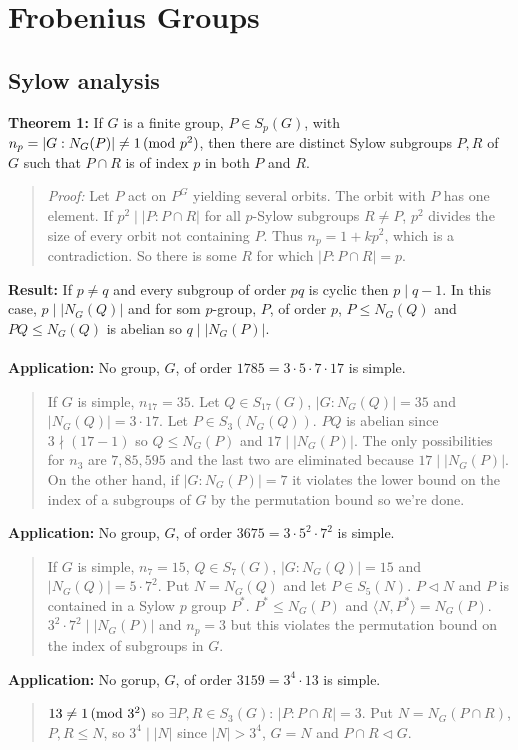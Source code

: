 \chapter{Frobenius Groups}
\section {Sylow analysis}
{\bf Theorem 1:} 
If $G$ is a finite group, $P \in S_p(G)$,  with $n_p = |G:N_G(P)| \ne 1 \thinspace \textnormal{(mod } p^2 \textnormal{)}$,
then there are distinct Sylow subgroups $P, R$ of $G$ such that $P \cap R$ is of index $p$
in both $P$ and $R$.
\begin{quote}
\emph{Proof:}
Let $P$ act on $P^G$ yielding several orbits.  The orbit with $P$ has one element.
If $p^2 \mid |P:P \cap R|$ for all $p$-Sylow subgroups $R \ne P$, $p^2$ divides the size of
every orbit not containing $P$.  Thus $n_p = 1 + kp^2$, which is a contradiction.  So there is
some $R$ for which $|P: P \cap R| = p$.
\end{quote}
{\bf Result:} If $p \ne q$ and every subgroup of order $pq$ is cyclic then $p \mid q-1$.  In this
case, $p \mid |N_G(Q)|$ and for som $p$-group, $P$, of order $p$, $P \leq N_G(Q)$ and $PQ \leq N_G(Q)$ is
abelian so $q \mid |N_G(P)|$.
\\
\\
{\bf Application:} No group, $G$, of order $1785 = 3 \cdot 5 \cdot 7 \cdot 17$ is simple.
\begin{quote}
If $G$ is simple,
$n_{17} =35$.  Let $Q \in S_{17}(G)$, $|G:N_G(Q)|=35$ and $|N_G(Q)|= 3 \cdot 17$.  Let $P \in S_3(N_G(Q))$.
$PQ$ is abelian since $3 \nmid (17 - 1)$ so $Q \leq N_G(P)$ and $17 \mid |N_G(P)|$.  The only possibilities for $n_3$ are
$7, 85, 595$ and the last two are eliminated because $17 \mid |N_G(P)|$.  On the other hand, if $|G:N_G(P)| =7$ it
violates the lower bound on the index of a subgroups of $G$ by the permutation bound so we're done.
\end{quote}
{\bf Application:} No group, $G$, of order $3675 = 3 \cdot 5^2 \cdot 7^2$ is simple.
\begin{quote}
If $G$ is simple, $n_7 = 15$, $Q \in S_7(G)$, $|G:N_G(Q)|= 15$ and $|N_G(Q)|= 5 \cdot 7^2$.  Put $N = N_G(Q)$ and
let $P \in S_5(N)$.  $P \lhd N$ and $P$ is contained in a Sylow $p$ group $P^*$. $P^* \leq N_G(P)$ and 
$\langle N, P^* \rangle= N_G(P)$.  $3^2 \cdot 7^2 \mid |N_G(P)|$ and $n_p = 3$ but this violates
the permutation bound on the index of subgroups in $G$.
\end{quote}
{\bf Application:} No gorup, $G$, of order $3159= 3^4 \cdot 13$ is simple.
\begin{quote}
$13 \ne 1 \thinspace \textnormal{(mod } 3^2 \textnormal{)}$ so $\exists P, R \in S_3(G)$: $|P:P \cap R| = 3$.  Put $N= N_G(P \cap R)$, $P, R \leq N$,
so $3^4 \mid |N|$ since $|N| > 3^4$, $G = N$ and $P \cap R \lhd G$.
\end{quote}
